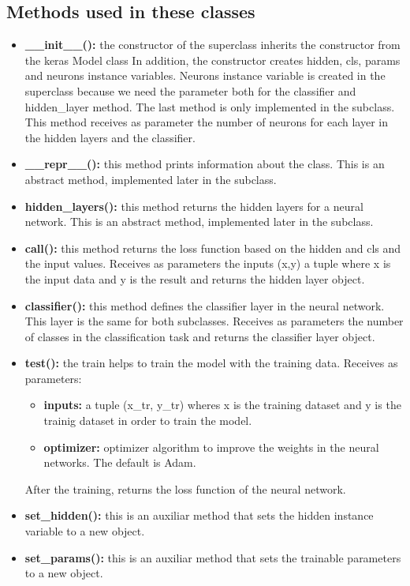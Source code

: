 \documentclass[11pt]{article}
\begin{document}
\subsection{Methods used in these classes}
\begin{itemize}
\item \textbf{\_\_init\_\_():} the constructor of the superclass inherits the constructor from the keras Model class In addition, the constructor creates hidden, cls, params and neurons instance variables. Neurons instance variable is created in the superclass because we need the parameter both for the classifier and hidden\_layer method. The last method is only implemented in the subclass. This method receives as parameter the number of neurons for each layer in the hidden layers and the classifier.
\item \textbf{\_\_repr\_\_():} this method prints information about the class. This is an abstract method, implemented later in the subclass.
\item \textbf{hidden\_layers():} this method returns the hidden layers for a neural network. This is an abstract method, implemented later in the subclass.
\item \textbf{call():} this method returns the loss function based on the hidden and cls and the input values. Receives as parameters the inputs (x,y) a tuple where x is the input data and y is the result and returns the hidden layer object.
\item \textbf{classifier():} this method defines the classifier layer in the neural network. This layer is the same for both subclasses. Receives as parameters the number of classes in the classification task and returns the classifier layer object.
\item \textbf{test():} the train helps to train the model with the training data. Receives as parameters:
\begin{itemize}
            \item \textbf{inputs:} a tuple (x\_tr, y\_tr) wheres x is the training dataset and y is the trainig dataset in order to train the model.
            \item \textbf{optimizer:} optimizer algorithm to improve the weights in the neural networks. The default is Adam.
\end{itemize}
After the training, returns the loss function of the neural network.
\item \textbf{set\_hidden():} this is an auxiliar method that sets the hidden instance variable to a new object.
\item \textbf{set\_params():} this is an auxiliar method that sets the trainable parameters to a new object.
\end{itemize}
\end{document}

